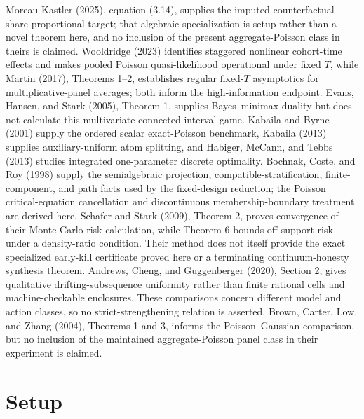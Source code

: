 \documentclass{article}
\begin{document}
Moreau-Kastler (2025), equation (3.14), supplies the imputed counterfactual-share proportional target; that algebraic specialization is setup rather than a novel theorem here, and no inclusion of the present aggregate-Poisson class in theirs is claimed. Wooldridge (2023) identifies staggered nonlinear cohort-time effects and makes pooled Poisson quasi-likelihood operational under fixed \(T\), while Martin (2017), Theorems 1--2, establishes regular fixed-\(T\) asymptotics for multiplicative-panel averages; both inform the high-information endpoint. Evans, Hansen, and Stark (2005), Theorem 1, supplies Bayes--minimax duality but does not calculate this multivariate connected-interval game. Kabaila and Byrne (2001) supply the ordered scalar exact-Poisson benchmark, Kabaila (2013) supplies auxiliary-uniform atom splitting, and Habiger, McCann, and Tebbs (2013) studies integrated one-parameter discrete optimality. Bochnak, Coste, and Roy (1998) supply the semialgebraic projection, compatible-stratification, finite-component, and path facts used by the fixed-design reduction; the Poisson critical-equation cancellation and discontinuous membership-boundary treatment are derived here. Schafer and Stark (2009), Theorem 2, proves convergence of their Monte Carlo risk calculation, while Theorem 6 bounds off-support risk under a density-ratio condition. Their method does not itself provide the exact specialized early-kill certificate proved here or a terminating continuum-honesty synthesis theorem. Andrews, Cheng, and Guggenberger (2020), Section 2, gives qualitative drifting-subsequence uniformity rather than finite rational cells and machine-checkable enclosures. These comparisons concern different model and action classes, so no strict-strengthening relation is asserted. Brown, Carter, Low, and Zhang (2004), Theorems 1 and 3, informs the Poisson--Gaussian comparison, but no inclusion of the maintained aggregate-Poisson panel class in their experiment is claimed.

\section{Setup}
\end{document}
